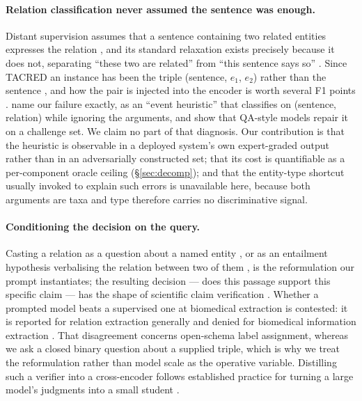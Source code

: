 \documentclass[11pt]{article}
\begin{document}
\paragraph{Relation classification never assumed the sentence was enough.}
Distant supervision assumes that a sentence containing two related entities expresses the
relation \citep{mintz2009distant}, and its standard relaxation exists precisely because it does
not, separating ``these two are related'' from ``this sentence says so''
\citep{riedel2010modeling}. Since TACRED an instance has been the triple (sentence, $e_1$,
$e_2$) rather than the sentence \citep{zhang2017position}, and how the pair is injected into the
encoder is worth several F1 points \citep{soares2019matching,wu2019enriching,zhou2022improved}.
\citet{rosenman2020exposing} name our failure exactly, as an ``event heuristic'' that
classifies on (sentence, relation) while ignoring the arguments, and show that QA-style models
repair it on a challenge set. We claim no part of that diagnosis. Our contribution is that the
heuristic is observable in a deployed system's own expert-graded output rather than in an
adversarially constructed set; that its cost is quantifiable as a per-component oracle ceiling
(\S\ref{sec:decomp}); and that the entity-type shortcut usually invoked to explain such errors
\citep{peng2020learning,mtumbuka2024entity} is unavailable here, because both arguments are
taxa and type therefore carries no discriminative signal.

\paragraph{Conditioning the decision on the query.}
Casting a relation as a question about a named entity \citep{levy2017zero}, or as an entailment
hypothesis verbalising the relation between two of them
\citep{obamuyide2018zero,sainz2021label}, is the reformulation our prompt instantiates; the
resulting decision --- does this passage support this specific claim --- has the shape of
scientific claim verification \citep{wadden2020fact}. Whether a prompted model beats a
supervised one at biomedical extraction is contested: it is reported for relation extraction
generally \citep{wadhwa2023revisiting,li2023zeroshotre} and denied for biomedical information
extraction \citep{jimenezgutierrez2022thinking,brokman2025benchmark}. That disagreement concerns
open-schema label assignment, whereas we ask a closed binary question about a supplied triple,
which is why we treat the reformulation rather than model scale as the operative variable.
Distilling such a verifier into a cross-encoder \citep{nogueira2019passage} follows established
practice for turning a large model's judgments into a small student
\citep{west2022symbolic,gekhman2023trueteacher}.
\end{document}
